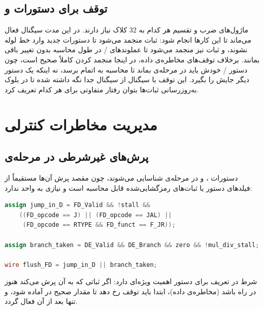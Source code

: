 \subsection{توقف برای دستورات  و }
ماژول‌های ضرب و تقسیم هر کدام به 32 کلاک نیاز دارند. در این مدت سیگنال  فعال می‌ماند تا این کارها انجام شود: ثبات  منجمد می‌شود تا دستورات جدید وارد خط لوله نشوند، و ثبات  نیز منجمد می‌شود تا عملوندهای / در طول محاسبه بدون تغییر باقی بمانند. برخلاف توقف‌های مخاطره‌ی داده، در اینجا منجمد کردن  کاملاً صحیح است، چون دستور / خودش باید در مرحله‌ی  بماند تا محاسبه به اتمام برسد، نه اینکه یک دستور دیگر جایش را بگیرد. این توقف با سیگنال  از سیگنال  جدا نگه داشته شده تا در بلوک به‌روزرسانی ثبات‌ها بتوان رفتار متفاوتی برای هر کدام تعریف کرد.

\section{مدیریت مخاطرات کنترلی}

\subsection{پرش‌های غیرشرطی در مرحله‌ی }
دستورات ،  و  در مرحله‌ی  شناسایی می‌شوند، چون مقصد پرش آن‌ها مستقیماً از فیلدهای دستور یا ثبات‌های رمزگشایی‌شده قابل محاسبه است و نیازی به واحد  ندارد:

\vspace{0.2cm}
\begin{latin}
    \begin{lstlisting}[language=Verilog]
assign jump_in_D = FD_Valid && !stall &&
    ((FD_opcode == J) || (FD_opcode == JAL) ||
     (FD_opcode == RTYPE && FD_funct == F_JR));

assign branch_taken = DE_Valid && DE_Branch && zero && !mul_div_stall;

wire flush_FD = jump_in_D || branch_taken;
    \end{lstlisting}
\end{latin}
\vspace{0.2cm}

شرط  در تعریف  برای دستور  اهمیت ویژه‌ای دارد: اگر ثباتی که  به آن پرش می‌کند هنوز در راه باشد (مخاطره‌ی داده)، ابتدا باید توقف رخ دهد تا مقدار صحیح در  آماده شود، و تنها بعد از آن  فعال گردد.


